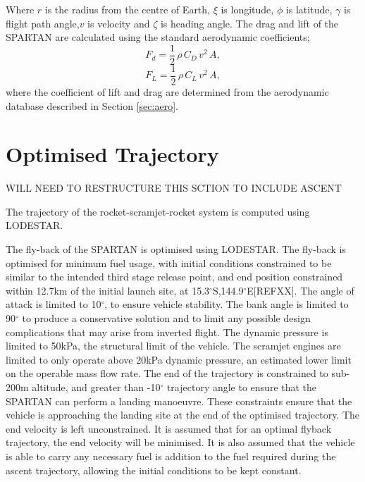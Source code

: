 \documentclass{article}
\begin{document}
Where $r$ is the radius from the centre of Earth, $\xi$ is longitude, $\phi$ is latitude, $\gamma$ is flight path angle,$v$ is velocity and $\zeta$ is heading angle. The drag and lift of the SPARTAN are calculated using the standard aerodynamic coefficients;
\begin{equation}
F_d = \frac{1}{2} \, \rho \, C_D \, v^2 \, A ,
\end{equation}
\begin{equation}
F_L = \frac{1}{2} \, \rho \, C_L \, v^2 \, A ,
\end{equation}
where the coefficient of lift and drag are determined from the aerodynamic database described in Section \ref{sec:aero}.


\section{Optimised Trajectory}
WILL NEED TO RESTRUCTURE THIS SCTION TO INCLUDE ASCENT


The trajectory of the rocket-scramjet-rocket system is computed using LODESTAR. 




The fly-back of the SPARTAN is optimised using LODESTAR. The fly-back is optimised for minimum fuel usage, with initial conditions constrained to be similar to the intended third stage release point, and end position constrained within 12.7km of the initial launch site, at  15.3$^\circ$S,144.9$^\circ$E[REFXX]. The angle of attack is limited to 10$^\circ$, to ensure vehicle stability. The bank angle is limited to 90$^\circ$ to produce a conservative solution and to limit any possible design complications that may arise from inverted flight. The dynamic pressure is limited to 50kPa, the structural limit of the vehicle. The scramjet engines are limited to only operate above 20kPa dynamic pressure, an estimated lower limit on the operable mass flow rate.
The end of the trajectory is constrained to sub-200m altitude, and greater than -10$^\circ$ trajectory angle to ensure that the SPARTAN can perform a landing manoeuvre. These constraints ensure that the vehicle is approaching the landing site at the end of the optimised trajectory. The end velocity is left unconstrained. It is assumed that for an optimal flyback trajectory, the end velocity will be minimised. 
It is also assumed that the vehicle is able to carry any necessary fuel is addition to the fuel required during the ascent trajectory, allowing the initial conditions to be kept constant. 
\end{document}
